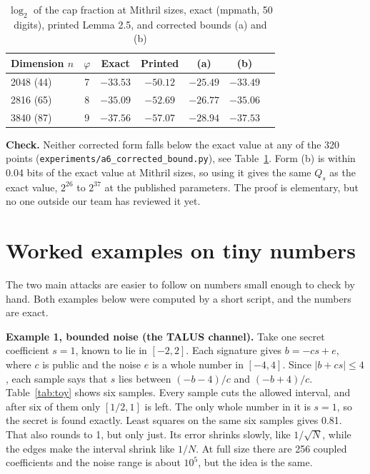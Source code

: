 \documentclass[10pt,conference,a4paper]{IEEEtran}
\begin{document}
\begin{table}[t]
\caption{$\log_2$ of the cap fraction at Mithril sizes, exact (mpmath, 50 digits), printed Lemma 2.5, and corrected bounds
(a) and (b)}\label{tab:a6}
\centering\footnotesize
\begin{tabular}{@{}lcccccc@{}}
\toprule
Dimension $n$ & $\varphi$ & Exact & Printed & (a) & (b)\\
\midrule
2048 (44) & 7 & $-33.53$ & $-50.12$ & $-25.49$ & $-33.49$\\
2816 (65) & 8 & $-35.09$ & $-52.69$ & $-26.77$ & $-35.06$\\
3840 (87) & 9 & $-37.56$ & $-57.07$ & $-28.94$ & $-37.53$\\
\bottomrule
\end{tabular}
\end{table}

\textbf{Check.} Neither corrected form falls below the exact value at any of the 320 points
(\texttt{experiments/a6\_corrected\_bound.py}), see Table~\ref{tab:a6}. Form (b) is within 0.04 bits of the exact value at
Mithril sizes, so using it gives the same $Q_s$ as the exact value, $2^{26}$ to $2^{37}$ at the published parameters. The
proof is elementary, but no one outside our team has reviewed it yet.

\section{Worked examples on tiny numbers}\label{app:examples}
The two main attacks are easier to follow on numbers small enough to check by hand. Both examples below were computed by a
short script, and the numbers are exact.

\textbf{Example 1, bounded noise (the TALUS channel).} Take one secret coefficient $s=1$, known to lie in $[-2,2]$. Each
signature gives $b=-c s+e$, where $c$ is public and the noise $e$ is a whole number in $[-4,4]$. Since $|b+c s|\le 4$, each
sample says that $s$ lies between $(-b-4)/c$ and $(-b+4)/c$. Table~\ref{tab:toy} shows six samples. Every sample cuts the
allowed interval, and after six of them only $[1/2,1]$ is left. The only whole number in it is $s=1$, so the secret is found
exactly. Least squares on the same six samples gives 0.81. That also rounds to 1, but only just. Its error shrinks slowly,
like $1/\sqrt N$, while the edges make the interval shrink like $1/N$. At full size there are 256 coupled coefficients and
the noise range is about $10^5$, but the idea is the same.
\end{document}
